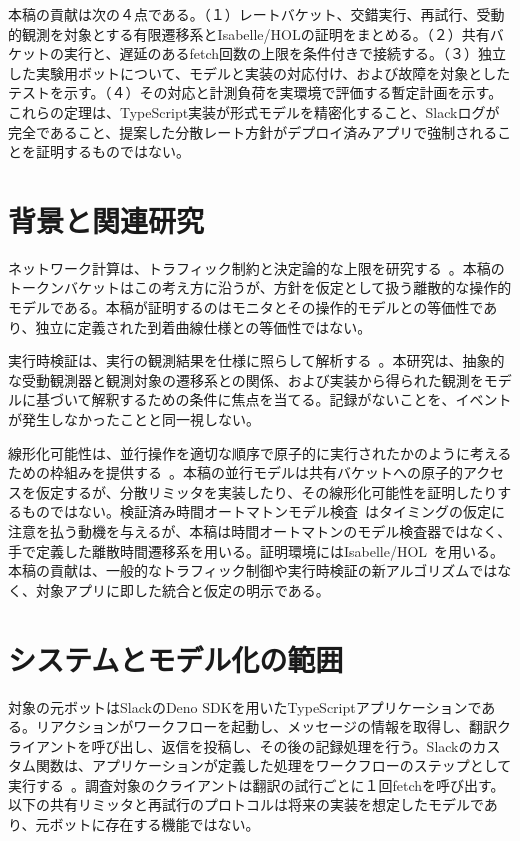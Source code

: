 \documentclass[10pt,twocolumn]{ltjsarticle}
\begin{document}
本稿の貢献は次の４点である。（１）レートバケット、交錯実行、再試行、受動的観測を対象とする有限遷移系とIsabelle/HOLの証明をまとめる。（２）共有バケットの実行と、遅延のあるfetch回数の上限を条件付きで接続する。（３）独立した実験用ボットについて、モデルと実装の対応付け、および故障を対象としたテストを示す。（４）その対応と計測負荷を実環境で評価する暫定計画を示す。これらの定理は、TypeScript実装が形式モデルを精密化すること、Slackログが完全であること、提案した分散レート方針がデプロイ済みアプリで強制されることを証明するものではない。

\section{背景と関連研究}
ネットワーク計算は、トラフィック制約と決定論的な上限を研究する~\cite{network,regulators}。本稿のトークンバケットはこの考え方に沿うが、方針を仮定として扱う離散的な操作的モデルである。本稿が証明するのはモニタとその操作的モデルとの等価性であり、独立に定義された到着曲線仕様との等価性ではない。

実行時検証は、実行の観測結果を仕様に照らして解析する~\cite{runtime}。本研究は、抽象的な受動観測器と観測対象の遷移系との関係、および実装から得られた観測をモデルに基づいて解釈するための条件に焦点を当てる。記録がないことを、イベントが発生しなかったことと同一視しない。

線形化可能性は、並行操作を適切な順序で原子的に実行されたかのように考えるための枠組みを提供する~\cite{linear}。本稿の並行モデルは共有バケットへの原子的アクセスを仮定するが、分散リミッタを実装したり、その線形化可能性を証明したりするものではない。検証済み時間オートマトンモデル検査~\cite{timed}はタイミングの仮定に注意を払う動機を与えるが、本稿は時間オートマトンのモデル検査器ではなく、手で定義した離散時間遷移系を用いる。証明環境にはIsabelle/HOL~\cite{isabelle}を用いる。本稿の貢献は、一般的なトラフィック制御や実行時検証の新アルゴリズムではなく、対象アプリに即した統合と仮定の明示である。

\section{システムとモデル化の範囲}
対象の元ボットはSlackのDeno SDKを用いたTypeScriptアプリケーションである。リアクションがワークフローを起動し、メッセージの情報を取得し、翻訳クライアントを呼び出し、返信を投稿し、その後の記録処理を行う。Slackのカスタム関数は、アプリケーションが定義した処理をワークフローのステップとして実行する~\cite{slackfunctions}。調査対象のクライアントは翻訳の試行ごとに１回fetchを呼び出す。以下の共有リミッタと再試行のプロトコルは将来の実装を想定したモデルであり、元ボットに存在する機能ではない。
\end{document}
